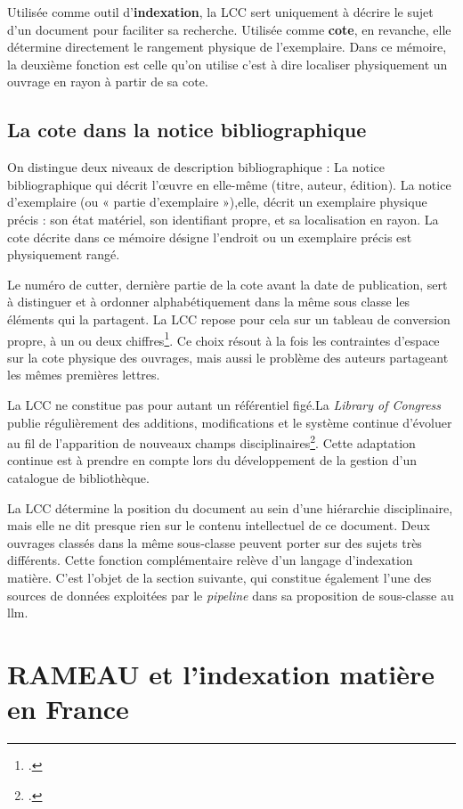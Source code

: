 Utilisée comme outil d'\textbf{indexation}, la LCC sert uniquement à décrire le sujet d'un document pour faciliter sa recherche. Utilisée comme \textbf{cote}, en revanche, elle détermine directement le rangement physique de l'exemplaire.
Dans ce mémoire, la deuxième fonction est celle qu'on utilise c'est à dire localiser physiquement un ouvrage en rayon à partir de sa cote. 

\subsection{La cote dans la notice bibliographique}
\label{sec:lcc-notice}

On distingue deux niveaux de description bibliographique : La notice bibliographique qui décrit l'œuvre en elle-même (titre, auteur, édition). La notice d'exemplaire (ou « partie d'exemplaire »),elle, décrit un exemplaire physique précis : son état matériel, son identifiant propre, et sa localisation en rayon. La cote décrite dans ce mémoire désigne l'endroit ou un exemplaire précis est physiquement rangé.

Le numéro de \gls{cutter}, dernière partie de la cote avant la date de publication, sert à distinguer et à ordonner alphabétiquement dans la même sous classe les éléments qui la partagent. La LCC repose pour cela sur un tableau de conversion propre, à un ou deux chiffres\footcite[p.~83]{chan1990}. Ce choix résout à la fois les contraintes d'espace sur la cote physique des ouvrages, mais aussi le problème des auteurs partageant les mêmes premières lettres.

La LCC ne constitue pas pour autant un référentiel figé.La \textit{Library of Congress} publie régulièrement des additions, modifications et le système continue d'évoluer au fil de l'apparition de nouveaux champs disciplinaires\footcite{tacq2006}. Cette adaptation continue est à prendre en compte lors du développement de la gestion d'un catalogue de bibliothèque.

La LCC détermine la position du document au sein d'une hiérarchie disciplinaire, mais elle ne dit presque rien sur le contenu intellectuel de ce document. Deux ouvrages classés dans la même sous-classe peuvent porter sur des sujets très différents. Cette fonction complémentaire relève d'un langage d'indexation matière. C'est l'objet de la section suivante, qui constitue également l'une des sources de données exploitées par le \textit{pipeline} dans sa proposition de sous-classe au \gls{llm}.


\section{RAMEAU et l'indexation matière en France}
\label{sec:rameau}

